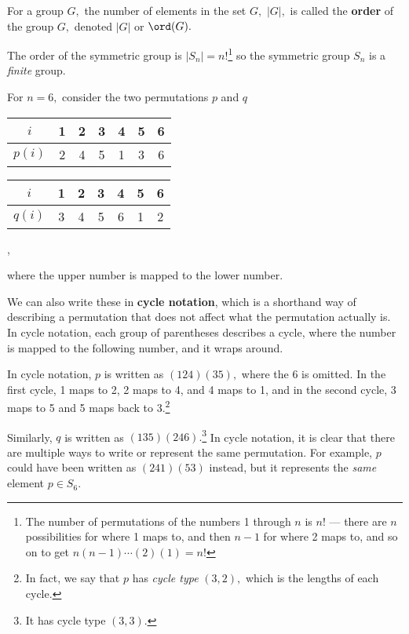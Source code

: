 \begin{definition}
For a group $G,$ the number of elements in the set $G,$ $|G|,$ is called the \textbf{order} of the group $G,$ denoted $|G|$ or $\ord(G).$
\end{definition}

The order of the symmetric group is $|S_n| = n!$\footnote{The number of permutations of the numbers 1 through $n$ is $n!$ --- there are $n$ possibilities for where 1 maps to, and then $n-1$ for where 2 maps to, and so on to get $n(n-1)\cdots (2)(1) = n!$} so the symmetric group $S_n$ is a \emph{finite} group.

For $n=6,$ consider the two permutations $p$ and $q$
\begin{center}
    \begin{tabular}{c|c c c c c c}
     $i$ & 1 & 2 & 3 & 4 & 5 & 6 \\
     \hline
     $p(i)$ & 2 & 4 & 5 & 1 & 3 & 6
\end{tabular}
\end{center}
\begin{center}
    \begin{tabular}{c|c c c c c c}
     $i$ & 1 & 2 & 3 & 4 & 5 & 6 \\
     \hline
     $q(i)$ & 3 & 4 & 5 & 6 & 1 & 2
\end{tabular},
\end{center}
where the upper number is mapped to the lower number.

We can also write these in \textbf{cycle notation}, which is a shorthand way of describing a permutation that does not affect what the permutation actually is. In cycle notation, each group of parentheses describes a cycle, where the number is mapped to the following number, and it wraps around.
\begin{example}
In cycle notation, $p$ is written as $(124)(35),$ where the 6 is omitted. In the first cycle, 1 maps to 2, 2 maps to 4, and 4 maps to 1, and in the second cycle, 3 maps to 5 and 5 maps back to 3.\footnote{In fact, we say that $p$ has \emph{cycle type} $(3, 2),$ which is the lengths of each cycle.}
\end{example}

Similarly, $q$ is written as $(135)(246).$\footnote{It has cycle type $(3, 3).$} In cycle notation, it is clear that there are multiple ways to write or represent the same permutation. For example, $p$ could have been written as $(241)(53)$ instead, but it represents the \emph{same} element $p \in S_6.$

